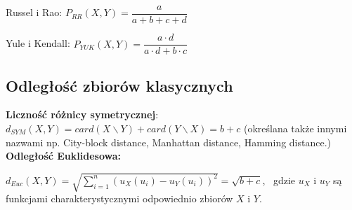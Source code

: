 Russel i Rao: $ P_{RR}(X,Y) = \dfrac{a}{a+b+c+d} $

Yule i Kendall: $ P_{YUK}(X,Y) = \dfrac{a \cdot d}{a \cdot d + b \cdot c} $

\subsection*{Odległość zbiorów klasycznych}

\textbf{Liczność różnicy symetrycznej}: $d_{SYM}(X, Y ) = card(X \backslash Y ) + card(Y \backslash X) = b + c$
(określana także innymi nazwami np. City-block distance, Manhattan distance, Hamming distance.) \\

\textbf{Odległość Euklidesowa:}

$d_{Euc}(X,Y) = \sqrt{\sum_{i=1}^{n} (u_X(u_i) - u_Y(u_i))^2} = \sqrt{b+c} $, \ gdzie $u_X$ i $u_Y$ są funkcjami charakterystycznymi
odpowiednio zbiorów $X$ i $Y$.